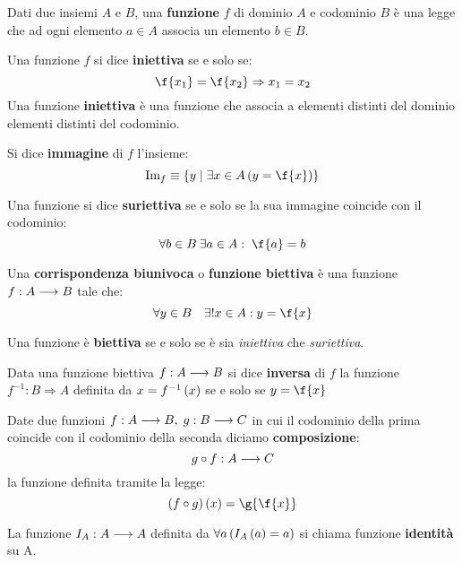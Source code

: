\documentclass{lectures}
\begin{document}
\begin{multicols}{2}
\begin{definition}[Funzione]
    Dati due insiemi \(A\) e \(B\), una \textbf{funzione} \(f\) di dominio \(A\) e codominio \(B\) è una legge che ad ogni elemento \(a \in A\) associa un elemento \(b \in B\).
\end{definition}
\begin{definition}
    Una funzione \(f\) si dice \textbf{iniettiva} se e solo se: \[
        \f{x_1} = \f{x_2} \Rightarrow x_1=x_2
    \]
    Una funzione \textbf{iniettiva} è una funzione che associa a elementi distinti del dominio elementi distinti del codominio.
\end{definition}
\begin{definition}
    Si dice \textbf{immagine} di \(f\) l'insieme:
    \[
        \text{Im}_f \equiv \crl{y\mid \exists x \in A\rnd{y=\f{x}}}
    \]
\end{definition}
\begin{definition}
    Una funzione si dice \textbf{suriettiva} se e solo se la sua immagine coincide con il codominio:
    \[
        \forall b \in B\: \exists a \in A: \; \f{a} = b
    \]
\end{definition}
\begin{definition}
Una \textbf{corrispondenza biunivoca} o \textbf{funzione biettiva} è una funzione \(f:A\longrightarrow B\) tale che: \[\forall y \in B \quad \exists! x \in A: y = \f{x}\]

Una funzione è \textbf{biettiva} se e solo se è sia \textit{iniettiva} che \textit{suriettiva}.
\end{definition}
\begin{definition}
    Data una funzione biettiva \(f:A\longrightarrow B\) si dice \textbf{inversa} di \(f\) la funzione \(f^{-1}: B\Rightarrow A\) definita da \(x = f^{-1}\left(x\right)\) se e solo se \(y = \f{x}\)
\end{definition}
\begin{definition}
    Date due funzioni \(f:A\longrightarrow B,\; g:B\longrightarrow C\) in cui il codominio della prima coincide con il codominio della seconda diciamo \textbf{composizione}:
    \[
        g \circ f:A\longrightarrow C
    \]
    la funzione definita tramite la legge:
    \[
        \rnd{f\circ g}\rnd{x}  = \g{\f{x}}
    \]
\end{definition}
\begin{definition}
    La funzione \(I_A:A\longrightarrow A\) definita da \(\forall a \left(I_A\left(a\right) = a\right)\) si chiama funzione \textbf{identità} su A.
    

\end{definition}
\end{multicols}
\end{document}
